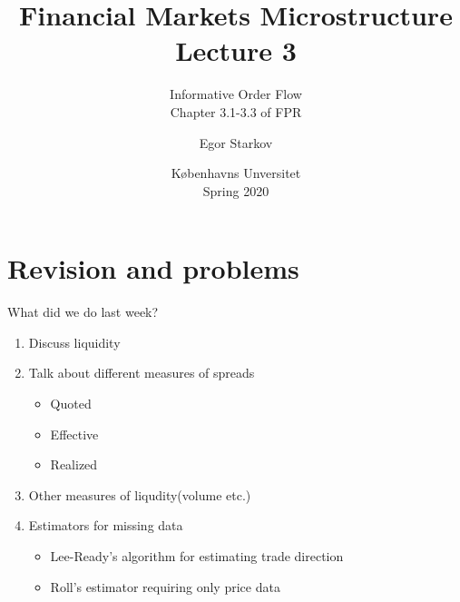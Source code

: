 




\title{Financial Markets Microstructure \\ Lecture 3}

\subtitle{Informative Order Flow\\
	Chapter 3.1-3.3 of FPR}

\author{Egor Starkov}

\date{K{\o}benhavns Unversitet \\
	Spring 2020}




	\frame[plain]{\titlepage}
	\addtocounter{framenumber}{-1}

\section{Revision and problems}

\begin{frame}{What did we do last week?}
\begin{enumerate}
	\item Discuss liquidity
	\item Talk about different measures of spreads
	\begin{itemize}
		\item Quoted
		\item Effective
		\item Realized
	\end{itemize}
	\item Other measures of liqudity(volume etc.)
	\item Estimators for missing data
	\begin{itemize}
		\item Lee-Ready's algorithm for estimating trade direction
		\item Roll's estimator requiring only price data
	\end{itemize}
\end{enumerate}
\end{frame}


